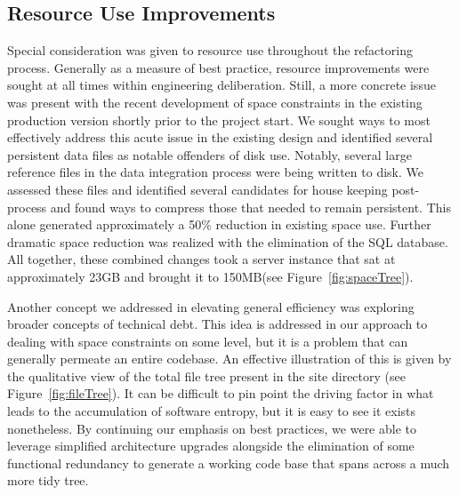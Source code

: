 \documentclass[10pt]{report}
\begin{document}
\subsection{Resource Use Improvements}
Special consideration was given to resource use throughout the refactoring process. Generally as a measure of best practice, resource improvements were sought at all times within engineering deliberation. Still, a more concrete issue was present with the recent development of space constraints in the existing production version shortly prior to the project start. We sought ways to most effectively address this acute issue in the existing design and identified several persistent data files as notable offenders of disk use. Notably, several large reference files in the data integration process were being written to disk. We assessed these files and identified several candidates for house keeping post-process and found ways to compress those that needed to remain persistent. This alone generated approximately a 50\% reduction in existing space use. Further dramatic space reduction was realized with the elimination of the SQL database. All together, these combined changes took a server instance that sat at approximately 23GB and brought it to 150MB\@ (see Figure~\ref{fig:spaceTree}).

Another concept we addressed in elevating general efficiency was exploring broader concepts of technical debt. This idea is addressed in our approach to dealing with space constraints on some level, but it is a problem that can generally permeate an entire codebase. An effective illustration of this is given by the qualitative view of the total file tree present in the site directory (see Figure~\ref{fig:fileTree}). It can be difficult to pin point the driving factor in what leads to the accumulation of software entropy, but it is easy to see it exists nonetheless. By continuing our emphasis on best practices, we were able to leverage simplified architecture upgrades alongside the elimination of some functional redundancy to generate a working code base that spans across a much more tidy tree.
\end{document}
